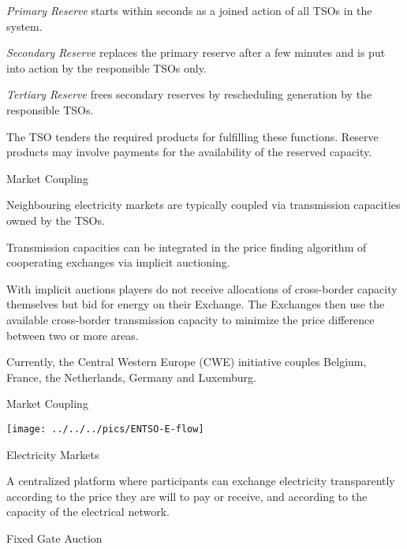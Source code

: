 



	{\it Primary Reserve}   starts within seconds as a joined action of all TSOs in the system.


	{\it Secondary Reserve} replaces the primary reserve after a few minutes and is put into action by the responsible TSOs only.


	{\it Tertiary Reserve} frees secondary reserves by rescheduling generation by the responsible TSOs.




The TSO tenders the required products for fulfilling these functions. Reserve products may involve payments for the availability of the reserved capacity.

{Market Coupling}






	Neighbouring electricity markets are typically coupled via transmission capacities owned by the TSOs.


	Transmission capacities can be integrated in the price finding algorithm of cooperating exchanges via implicit auctioning.


	With implicit auctions  players do not  receive allocations of cross-border capacity themselves but bid for energy on their Exchange. The Exchanges then use the available cross-border transmission capacity to minimize the price difference between two or more areas.


	Currently, the Central Western Europe (CWE) initiative couples Belgium, France, the Netherlands, Germany and Luxemburg.





{Market Coupling}
\begin{center}
\texttt{[image: ../../../pics/ENTSO-E-flow]}
\end{center}

{Electricity Markets}

A centralized platform where participants can exchange electricity transparently
according to the price they are will to pay or receive, and according to the capacity of
the electrical network.







	Fixed Gate Auction


